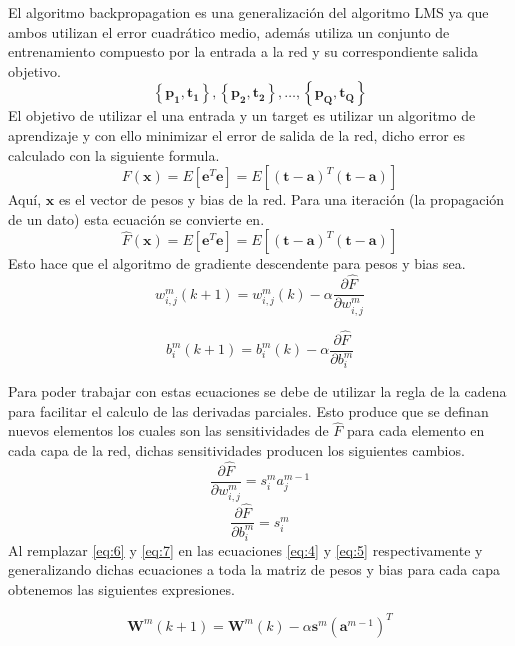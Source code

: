 El algoritmo backpropagation es una generalización del algoritmo LMS ya que ambos utilizan el error cuadrático medio, además utiliza un conjunto de entrenamiento compuesto por la entrada a la red y su correspondiente salida objetivo.
\[ \left\lbrace \boldsymbol{p_1}, \boldsymbol{t_1} \right\rbrace, \left\lbrace \boldsymbol{p_2}, \boldsymbol{t_2} \right\rbrace, \dots, \left\lbrace \boldsymbol{p_Q}, \boldsymbol{t_Q} \right\rbrace  \]
El objetivo de utilizar el una entrada y un target es utilizar un algoritmo de aprendizaje y con ello minimizar el error de salida de la red, dicho error es calculado con la siguiente formula.
\[ F(\boldsymbol{x}) = E \left[ \boldsymbol{e}^{T}\boldsymbol{e} \right] = E \left[ (\boldsymbol{t-a})^{T}(\boldsymbol{t-a}) \right]  \]
Aquí, $\boldsymbol{x}$ es el vector de pesos y bias de la red. Para una iteración (la propagación de un dato) esta ecuación se convierte en.
\[ \hat{F} (\boldsymbol{x}) = E \left[ \boldsymbol{e}^{T}\boldsymbol{e} \right] = E \left[ (\boldsymbol{t-a})^{T}(\boldsymbol{t-a}) \right]  \]
Esto hace que el algoritmo de gradiente descendente para pesos y bias sea.
\begin{equation} \label{eq:4}
w_{i, j}^{m}(k+1) = w_{i, j}^{m}(k) - \alpha \frac{\partial \hat{F}}{\partial w_{i, j}^{m}}
\end{equation}

\begin{equation} \label{eq:5}
b_{i}^{m}(k+1) = b_{i}^{m}(k) - \alpha \frac{\partial \hat{F}}{\partial b_{i}^{m}}
\end{equation}

Para poder trabajar con estas ecuaciones se debe de utilizar la regla de la cadena para facilitar el calculo de las derivadas parciales. Esto produce que se definan nuevos elementos los cuales son las sensitividades de $\hat{F}$ para cada elemento en cada capa de la red, dichas sensitividades producen los siguientes cambios.
\begin{equation} \label{eq:6}
\frac{\partial \hat{F}}{\partial w_{i, j}^{m}} = s_{i}^{m}a_{j}^{m-1}
\end{equation}
\begin{equation} \label{eq:7}
\frac{\partial \hat{F}}{\partial b_{i}^{m}} = s_{i}^{m}
\end{equation}
Al remplazar \ref{eq:6} y \ref{eq:7} en las ecuaciones \ref{eq:4} y \ref{eq:5} respectivamente y generalizando dichas ecuaciones a toda la matriz de pesos y bias para cada capa obtenemos las siguientes expresiones.

\begin{equation} \label{eq:8}
\boldsymbol{W}^{m}(k+1) = \boldsymbol{W}^{m}(k) - \alpha \boldsymbol{s}^{m} (\boldsymbol{a}^{m-1})^T
\end{equation}

